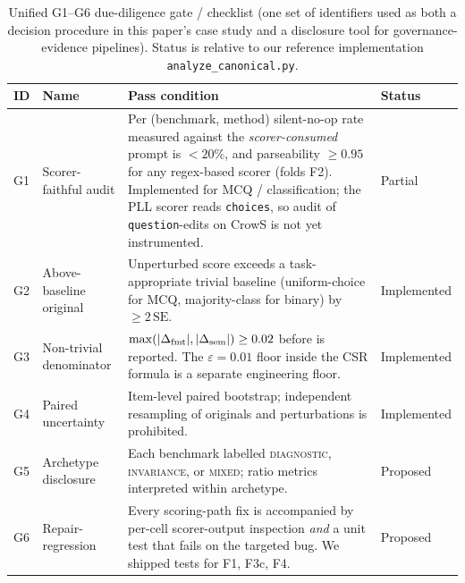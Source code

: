 \begin{table}[t]
\centering
\small
\caption{Unified G1--G6 due-diligence gate / checklist (one set of
identifiers used as both a decision procedure in this paper's case
study and a disclosure tool for governance-evidence pipelines).
Status is relative to our reference implementation
\texttt{analyze\_canonical.py}.}
\label{tab:checklist}
\begin{tabular}{p{}p{}p{}p{}}
\toprule
ID & Name & Pass condition & Status \\
\midrule
G1 & Scorer-faithful audit &
Per (benchmark, method) silent-no-op rate measured against the
\emph{scorer-consumed} prompt is $<20\%$, and parseability $\geq
0.95$ for any regex-based scorer (folds F2). Implemented for MCQ /
classification; the PLL scorer reads \texttt{choices}, so audit of
\texttt{question}-edits on CrowS is not yet instrumented. &
Partial \\
\addlinespace
G2 & Above-baseline original &
Unperturbed score exceeds a task-appropriate trivial baseline
(uniform-choice for MCQ, majority-class for binary) by $\geq 2\,\mathrm{SE}$. &
Implemented \\
\addlinespace
G3 & Non-trivial denominator &
$\max(|\Delta_{\mathrm{fmt}}|, |\Delta_{\mathrm{sem}}|) \geq 0.02$ before \csr{} is reported. The
$\varepsilon = 0.01$ floor inside the CSR formula is a separate
engineering floor. &
Implemented \\
\addlinespace
G4 & Paired uncertainty &
Item-level paired bootstrap; independent resampling of originals and
perturbations is prohibited. &
Implemented \\
\addlinespace
G5 & Archetype disclosure &
Each benchmark labelled \textsc{diagnostic}, \textsc{invariance}, or
\textsc{mixed}; ratio metrics interpreted within archetype. &
Proposed \\
\addlinespace
G6 & Repair-regression &
Every scoring-path fix is accompanied by per-cell scorer-output
inspection \emph{and} a unit test that fails on the targeted bug. We
shipped tests for F1, F3c, F4. &
Proposed \\
\bottomrule
\end{tabular}
\end{table}
